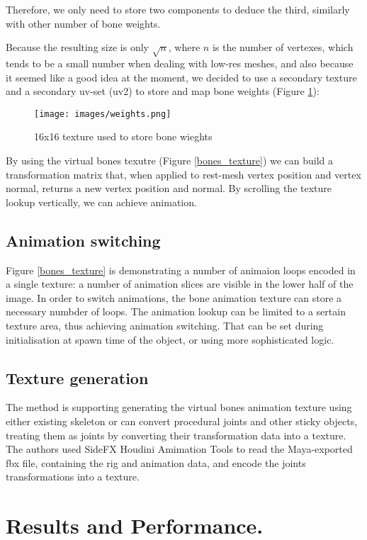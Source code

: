 \documentclass{acmsiggraph}
\begin{document}
Therefore, we only need to store two components to deduce the third, similarly with other number of bone weights.

Because the resulting size is only $ \sqrt n $, where $ n $ is the number of vertexes, which tends to be a small number when dealing with low-res meshes, and also because it seemed like a good idea at the moment, we decided to use a secondary texture and a secondary uv-set (uv2) to store and map bone weights (Figure \ref{weights_texture}):

\begin{figure}[ht]
  \centering
  \texttt{[image: images/weights.png]}
  \caption{16x16 texture used to store bone wieghts}
  \label{weights_texture}
\end{figure}

By using the virtual bones texutre (Figure \ref{bones_texture}) we can build a transformation matrix that, when applied to rest-mesh vertex position and vertex normal, returns a new vertex position and normal.  By scrolling the texture lookup vertically, we can achieve animation.

\subsection{Animation switching}

Figure \ref{bones_texture} is demonstrating a number of animaion loops encoded in a single texture: a number of animation slices are visible in the lower half of the image.  In order to switch animations, the bone animation texture can store a necessary numbder of loops.  The animation lookup can be limited to a sertain texture area, thus achieving animation switching. That can be set during initialisation at spawn time of the object, or using more sophisticated logic.

\subsection{Texture generation}

The method is supporting generating the virtual bones animation texture using either existing skeleton or can convert procedural joints and other sticky objects, treating them as joints by converting their transformation data into a texture. The authors used SideFX Houdini Amimation Tools to read the Maya-exported fbx file, containing the rig and animation data, and encode the joints transformations into a texture.

\section{Results and Performance.}
\end{document}
